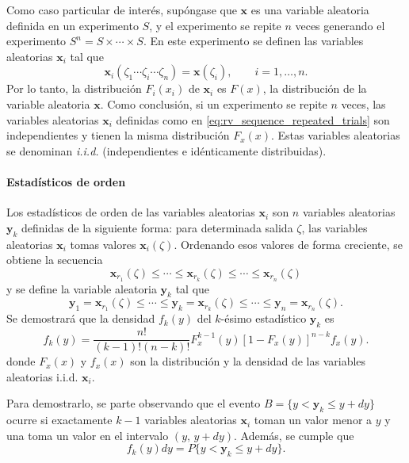 \documentclass[a4paper]{report}
\newcommand{\x}{\mathbf{x}}
\newcommand{\y}{\mathbf{y}}
\begin{document}
Como caso particular de interés, supóngase que \(\x\) es una variable aleatoria definida en un experimento \(S\), y el experimento se repite \(n\) veces generando el experimento \(S^n=S\times\cdots\times S\). En este experimento se definen las variables aleatorias \(\x_i\) tal que
\begin{equation}\label{eq:rv_sequence_repeated_trials}
 \x_i(\zeta_1\cdots\zeta_i\cdots\zeta_n)=\x(\zeta_i),\qquad i=1,\dots,n.
\end{equation}
Por lo tanto, la distribución \(F_i(x_i)\) de \(\x_i\) es \(F(x)\), la distribución de la variable aleatoria \(\x\). Como conclusión, si un experimento se repite \(n\) veces, las variables aleatorias \(\x_i\) definidas como en \ref{eq:rv_sequence_repeated_trials} son independientes y tienen la misma distribución \(F_x(x)\). Estas variables aleatorias se denominan \emph{i.i.d.} (independientes e idénticamente distribuidas).

\paragraph{Estadísticos de orden}

Los estadísticos de orden de las variables aleatorias \(\x_i\) son \(n\) variables aleatorias \(\y_k\) definidas de la siguiente forma: para determinada salida \(\zeta\), las variables aleatorias \(\x_i\) tomas valores \(\x_i(\zeta)\). Ordenando esos valores de forma creciente, se obtiene la secuencia
\[
 \x_{r_1}(\zeta)\leq\cdots\leq\x_{r_k}(\zeta)\leq\cdots\leq\x_{r_n}(\zeta) 
\]
y se define la variable aleatoria \(\y_k\) tal que
\begin{equation}\label{eq:ordered_statistic_definition}
 \y_1=\x_{r_1}(\zeta)\leq\cdots\leq\y_k=\x_{r_k}(\zeta)\leq\cdots\leq\y_n=\x_{r_n}(\zeta).
\end{equation}
Se demostrará que la densidad \(f_k(y)\) del \(k\)-ésimo estadístico \(\y_k\) es
\begin{equation}\label{eq:ordered_statistic_density}
 f_k(y)=\frac{n!}{(k-1)!(n-k)!}F_x^{k-1}(y)[1-F_x(y)]^{n-k}f_x(y).
\end{equation}
donde \(F_x(x)\) y \(f_x(x)\) son la distribución y la densidad de las variables aleatorias i.i.d. \(\x_i\).

Para demostrarlo, se parte observando que el evento \(B=\{y<\y_k\leq y+dy\}\) ocurre si exactamente \(k-1\) variables aleatorias \(\x_i\) toman un valor menor a \(y\) y una toma un valor en el intervalo \((y,\,y+dy)\).
Además, se cumple que 
\[
 f_k(y)dy=P\{y<\y_k\leq y+dy\}.
\]
\end{document}
